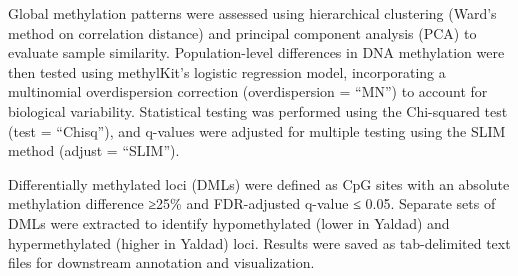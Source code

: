 \documentclass[
]{agujournal2019}
\begin{document}
Global methylation patterns were assessed using hierarchical clustering
(Ward's method on correlation distance) and principal component analysis
(PCA) to evaluate sample similarity. Population-level differences in DNA
methylation were then tested using methylKit's logistic regression
model, incorporating a multinomial overdispersion correction
(overdispersion = ``MN'') to account for biological variability.
Statistical testing was performed using the Chi-squared test (test =
``Chisq''), and q-values were adjusted for multiple testing using the
SLIM method (adjust = ``SLIM'').

Differentially methylated loci (DMLs) were defined as CpG sites with an
absolute methylation difference ≥25\% and FDR-adjusted q-value ≤ 0.05.
Separate sets of DMLs were extracted to identify hypomethylated (lower
in Yaldad) and hypermethylated (higher in Yaldad) loci. Results were
saved as tab-delimited text files for downstream annotation and
visualization.
\end{document}
